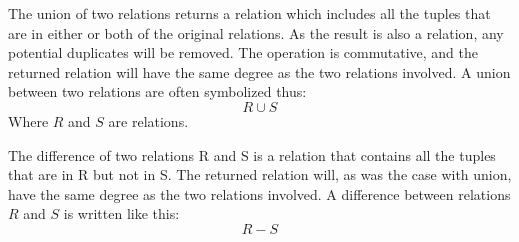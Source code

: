 The union of two relations returns a relation which includes all the tuples that are in either or both of the original relations. As the result is also a relation, any potential duplicates will be removed. The operation is commutative, and the returned relation will have the same degree as the two relations involved. A union between two relations are often symbolized thus:
\begin{equation*}
R \cup S
\end{equation*}
Where $R$ and $S$ are relations.

The difference of two relations R and S is a relation that contains all the tuples that are in R but not in S. The returned relation will, as was the case with union, have the same degree as the two relations involved. A difference between relations $R$ and $S$ is written like this:
\begin{equation*}
R - S 
\end{equation*}

